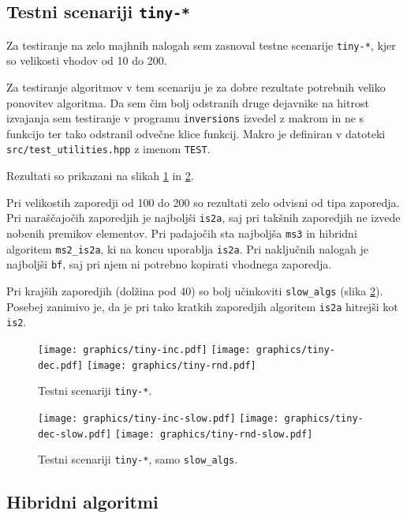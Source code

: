 \documentclass[11pt,a4paper]{article}
\theoremstyle{plain}
\theoremstyle{definition}
\begin{document}
\subsection{Testni scenariji \lstinline!tiny-*!}

Za testiranje na zelo majhnih nalogah sem zasnoval testne scenarije \lstinline!tiny-*!, kjer so velikosti vhodov od 10 do 200.

Za testiranje algoritmov v tem scenariju je za dobre rezultate potrebnih veliko ponovitev algoritma. Da sem čim bolj odstranih druge dejavnike na hitrost izvajanja sem testiranje v programu \lstinline!inversions! izvedel z makrom in ne s funkcijo ter tako odstranil odvečne klice funkcij. Makro je definiran v datoteki \lstinline!src/test_utilities.hpp! z imenom \lstinline!TEST!.

Rezultati so prikazani na slikah \ref{fig:tiny} in \ref{fig:tiny-slow}.

Pri velikostih zaporedji od 100 do 200 so rezultati zelo odvisni od tipa zaporedja. Pri naraščajočih zaporedjih je najboljši \lstinline!is2a!, saj pri takšnih zaporedjih ne izvede nobenih premikov elementov. Pri padajočih sta najboljša \lstinline!ms3! in hibridni algoritem \lstinline!ms2_is2a!, ki na koncu uporablja \lstinline!is2a!. Pri naključnih nalogah je najboljši \lstinline!bf!, saj pri njem ni potrebno kopirati vhodnega zaporedja.

Pri krajših zaporedjih (dolžina pod 40) so bolj učinkoviti \lstinline!slow_algs! (slika \ref{fig:tiny-slow}). Posebej zanimivo je, da je pri tako kratkih zaporedjih algoritem \lstinline!is2a! hitrejši kot \lstinline!is2!.

\begin{figure}
\texttt{[image: graphics/tiny-inc.pdf]}
\texttt{[image: graphics/tiny-dec.pdf]}
\texttt{[image: graphics/tiny-rnd.pdf]}
\caption{Testni scenariji \lstinline!tiny-*!.}
\label{fig:tiny}
\end{figure}

\begin{figure}
\texttt{[image: graphics/tiny-inc-slow.pdf]}
\texttt{[image: graphics/tiny-dec-slow.pdf]}
\texttt{[image: graphics/tiny-rnd-slow.pdf]}
\caption{Testni scenariji \lstinline!tiny-*!, samo \lstinline!slow_algs!.}
\label{fig:tiny-slow}
\end{figure}

\subsection{Hibridni algoritmi}
\end{document}
